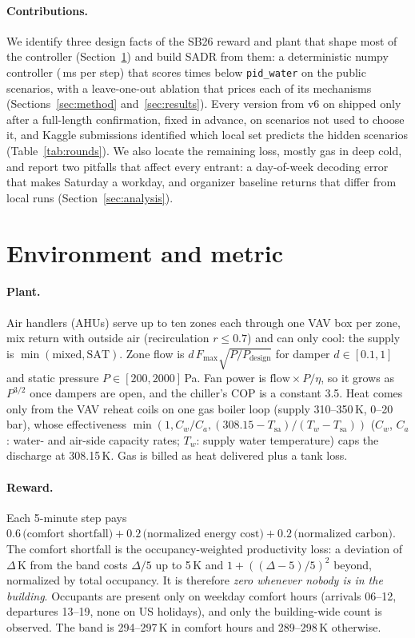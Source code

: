 \documentclass{article}
\begin{document}
\paragraph{Contributions.} We identify three design facts of the SB26 reward and plant that shape most of the controller (Section~\ref{sec:env}) and build SADR from them: a deterministic numpy controller (\PolicyMsOurs{}\,ms per step) that scores \RElvPwTimes{} times below \texttt{pid\_water} on the public scenarios, with a leave-one-out ablation that prices each of its mechanisms (Sections~\ref{sec:method} and~\ref{sec:results}). Every version from v6 on shipped only after a full-length confirmation, fixed in advance, on scenarios not used to choose it, and Kaggle submissions identified which local set predicts the hidden scenarios (Table~\ref{tab:rounds}). We also locate the remaining loss, mostly gas in deep cold, and report two pitfalls that affect every entrant: a day-of-week decoding error that makes Saturday a workday, and organizer baseline returns that differ from local runs (Section~\ref{sec:analysis}).

\section{Environment and metric}
\label{sec:env}

\paragraph{Plant.} Air handlers (AHUs) serve up to ten zones each through one VAV box per zone, mix return with outside air (recirculation $r\le 0.7$) and can only cool: the supply is $\min(\text{mixed}, \text{SAT})$. Zone flow is $d\,F_{\max}\sqrt{P/P_{\text{design}}}$ for damper $d\in[0.1,1]$ and static pressure $P\in[200,2000]$\,Pa. Fan power is $\text{flow}\times P/\eta$, so it grows as $P^{3/2}$ once dampers are open, and the chiller's COP is a constant 3.5. Heat comes only from the VAV reheat coils on one gas boiler loop (supply 310--350\,K, 0--20\,bar), whose effectiveness $\min(1, C_w/C_a, (308.15-T_{\text{sa}})/(T_w - T_{\text{sa}}))$ ($C_w$, $C_a$: water- and air-side capacity rates; $T_w$: supply water temperature) caps the discharge at 308.15\,K. Gas is billed as heat delivered plus a tank loss.

\paragraph{Reward.} Each 5-minute step pays $0.6\,\text{(comfort shortfall)} + 0.2\,\text{(normalized energy cost)} + 0.2\,\text{(normalized carbon)}$. The comfort shortfall is the occupancy-weighted productivity loss: a deviation of $\Delta$\,K from the band costs $\Delta/5$ up to 5\,K and $1+((\Delta-5)/5)^2$ beyond, normalized by total occupancy. It is therefore \emph{zero whenever nobody is in the building}. Occupants are present only on weekday comfort hours (arrivals 06--12, departures 13--19, none on US holidays), and only the building-wide count is observed. The band is 294--297\,K in comfort hours and 289--298\,K otherwise.
\end{document}
